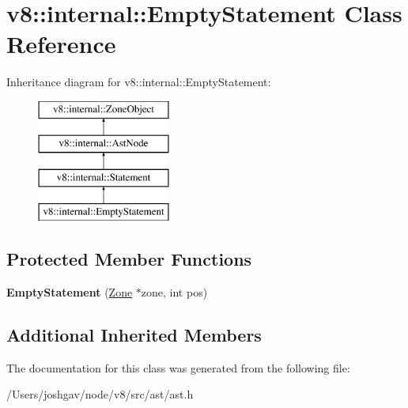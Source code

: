\hypertarget{classv8_1_1internal_1_1_empty_statement}{}\section{v8\+:\+:internal\+:\+:Empty\+Statement Class Reference}
\label{classv8_1_1internal_1_1_empty_statement}
Inheritance diagram for v8\+:\+:internal\+:\+:Empty\+Statement\+:\begin{figure}[H]
\begin{center}
\leavevmode
\includegraphics[height=4.000000cm]{classv8_1_1internal_1_1_empty_statement}
\end{center}
\end{figure}
\subsection*{Protected Member Functions}
\begin{DoxyCompactItemize}
\item 
{\bfseries Empty\+Statement} (\hyperlink{classv8_1_1internal_1_1_zone}{Zone} $\ast$zone, int pos)\hypertarget{classv8_1_1internal_1_1_empty_statement_ab6edfd077e9ff256e90d0b919c478889}{}\label{classv8_1_1internal_1_1_empty_statement_ab6edfd077e9ff256e90d0b919c478889}

\end{DoxyCompactItemize}
\subsection*{Additional Inherited Members}


The documentation for this class was generated from the following file\+:\begin{DoxyCompactItemize}
\item 
/\+Users/joshgav/node/v8/src/ast/ast.\+h\end{DoxyCompactItemize}
